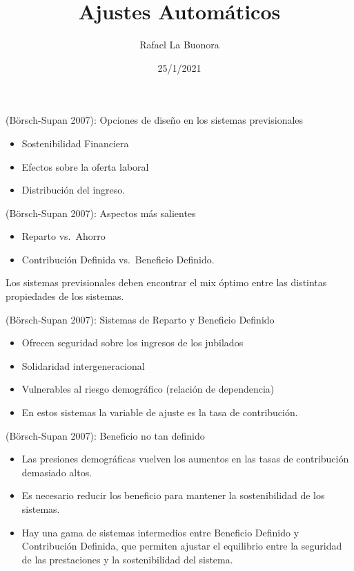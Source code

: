 \documentclass[ignorenonframetext,]{beamer}
\title{Ajustes Automáticos}
\author{Rafael La Buonora}
\date{25/1/2021}
\providecommand{\tightlist}{%
  \setlength{\itemsep}{0pt}\setlength{\parskip}{0pt}}
\begin{document}
\frame{\titlepage}

\begin{frame}{(Börsch-Supan 2007): Opciones de diseño en los sistemas
previsionales}

\begin{itemize}
\tightlist
\item
  Sostenibilidad Financiera
\item
  Efectos sobre la oferta laboral
\item
  Distribución del ingreso.
\end{itemize}

\end{frame}

\begin{frame}{(Börsch-Supan 2007): Aspectos más salientes}

\begin{itemize}
\tightlist
\item
  Reparto vs.~Ahorro
\item
  Contribución Definida vs.~Beneficio Definido.
\end{itemize}

Los sistemas previsionales deben encontrar el mix óptimo entre las
distintas propiedades de los sistemas.

\end{frame}

\begin{frame}{(Börsch-Supan 2007): Sistemas de Reparto y Beneficio
Definido}

\begin{itemize}
\tightlist
\item
  Ofrecen seguridad sobre los ingresos de los jubilados
\item
  Solidaridad intergeneracional
\item
  Vulnerables al riesgo demográfico (relación de dependencia)
\item
  En estos sistemas la variable de ajuste es la tasa de contribución.
\end{itemize}

\end{frame}

\begin{frame}{(Börsch-Supan 2007): Beneficio no tan definido}

\begin{itemize}
\tightlist
\item
  Las presiones demográficas vuelven los aumentos en las tasas de
  contribución demasiado altos.
\item
  Es necesario reducir los beneficio para mantener la sostenibilidad de
  los sistemas.
\item
  Hay una gama de sistemas intermedios entre Beneficio Definido y
  Contribución Definida, que permiten ajustar el equilibrio entre la
  seguridad de las prestaciones y la sostenibilidad del sistema.
\end{itemize}

\end{frame}
\end{document}
